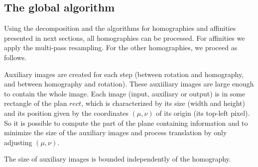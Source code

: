 \subsection{The global algorithm}
 \label{translainsta}
 
 Using the decomposition and the algorithms for homographies and affinities presented in next sections, all homographies can be processed. For affinities we apply the multi-pass resampling. For the other homographies, we proceed as follows.
  
 
 Auxiliary images are created for each step (between rotation and homography, and between homography and rotation). These auxiiliary images are large enough to contain the whole image. Each image (input, auxiliary or output) is in some rectangle of the plan $rect$, which is characterized by its size (width and height) and its position given by the coordinates $(\mu,\nu)$ of its origin (its top-left pixel). So it is possible to compute the part of the plane containing information and to minimize the size of the auxiliary images and process translation by only adjusting $(\mu,\nu)$.
 
 \begin{prop}
 The size of auxiliary images is bounded independently of the homography.
 \end{prop}
 
 
 
